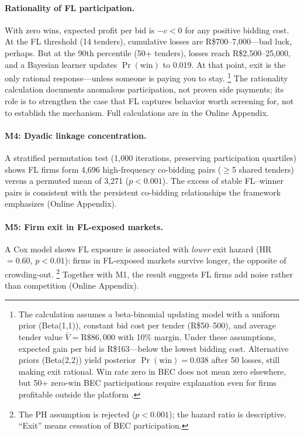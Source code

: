 \paragraph{Rationality of FL participation.}
\label{sec:rationality}
With zero wins, expected profit per bid is $-c < 0$ for any positive
bidding cost. At the FL threshold (14 tenders), cumulative losses
are R\$700--7,000---bad luck, perhaps. But at the 90th percentile
(50+ tenders), losses reach R\$2,500--25,000, and a Bayesian learner
updates $\Pr(\text{win})$ to 0.019. At that point, exit is the only
rational response---unless someone is paying you to stay.%
\footnote{The calculation assumes a beta-binomial updating model with
a uniform prior (Beta(1,1)), constant bid cost per tender
(R\$50--500), and average tender value $\bar{V} = \text{R\$}86{,}000$
with 10\% margin. Under these assumptions, expected gain per bid is
R\$163---below the lowest bidding cost. Alternative priors
(Beta(2,2)) yield posterior $\Pr(\text{win}) = 0.038$ after 50
losses, still making exit rational. Win rate zero in BEC does not
mean zero elsewhere, but 50+ zero-win BEC participations require
explanation even for firms profitable outside the platform
\citep{asker2010leniency, marshall2012economics}.}
The rationality calculation documents anomalous participation, not
proven side payments; its role is to strengthen the case that FL
captures behavior worth screening for, not to establish the
mechanism. Full calculations are in the Online Appendix.

\paragraph{M4: Dyadic linkage concentration.}
A stratified permutation test (1,000 iterations, preserving
participation quartiles) shows FL firms form 4,696 high-frequency
co-bidding pairs ($\geq$5 shared tenders) versus a permuted mean of
3,271 ($p < 0.001$). The excess of stable FL--winner pairs is
consistent with the persistent co-bidding relationships the
framework emphasizes
(Online Appendix).

\paragraph{M5: Firm exit in FL-exposed markets.}
A Cox model shows FL exposure is associated with \emph{lower} exit
hazard (HR~$= 0.60$, $p < 0.01$): firms in FL-exposed markets survive
longer, the opposite of crowding-out.%
\footnote{The PH assumption is rejected ($p < 0.001$); the hazard
ratio is descriptive. ``Exit'' means cessation of BEC participation.}
Together with M1, the result suggests FL firms add
noise rather than competition
(Online Appendix).


